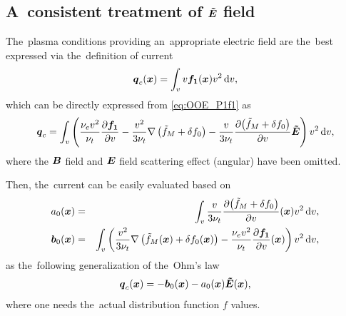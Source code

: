 \documentclass[preprint,12pt]{elsarticle}
\newcounter{bla}
\begin{document}
\subsection{A~consistent treatment of $\boldsymbol{\tilde{E}}$ field}
\label{sec:OOE_E_treatment}
The~plasma conditions providing an~appropriate electric field
are the~best expressed via the~definition of current
\begin{equation}
  \boldsymbol{q}_c(\boldsymbol{x}) = \int_{v}
  v\boldsymbol{f_1}(\boldsymbol{x}) v^2\, \text{d}v , 
  \nonumber 
\end{equation}
which can be directly expressed from \eqref{eq:OOE_P1f1} as
\begin{equation}
  \boldsymbol{q}_c =
  \int_{v} \left(\frac{\nu_{e}v^2}{\nu_{t}}\frac{\partial{\boldsymbol{f_1}}}{\partial{v}}
  - \frac{v^2}{3\nu_{t}}\nabla\left(\tilde{f}_M + \delta f_0\right) - 
  \frac{v}{3\nu_{t}}\frac{\partial{\left(\tilde{f}_M+ \delta f_0\right)}}{\partial{v}}\boldsymbol{\tilde{E}}
  \right) v^2\, \text{d}v ,
  \label{eq:OOE_P1current}
\end{equation}
where the $\boldsymbol{B}$ field and $\boldsymbol{E}$ field scattering effect (angular) have been 
omitted.  

Then, the~current can be easily evaluated based on
\begin{eqnarray}
  a_0(\boldsymbol{x}) &=& \int_{v}\frac{v}{3 \nu_{t}} \frac{\partial{\left(\tilde{f}_M+ \delta f_0\right)}}{\partial{v}}(\boldsymbol{x})
  v^2\, \text{d}v , \nonumber \\
  \boldsymbol{b}_{0}(\boldsymbol{x}) &=& \int_{v}\left(  
  \frac{v^2}{3 \nu_{t}}\nabla\left(\tilde{f}_M(\boldsymbol{x}) + \delta f_0(\boldsymbol{x})\right)
  - \frac{\nu_{e}v^2}{\nu_{t}}\frac{\partial{\boldsymbol{f_1}}}{\partial{v}}(\boldsymbol{x})
  \right)v^2\, \text{d}v , \nonumber 
\end{eqnarray}
as the~following generalization of the~Ohm's law
\begin{equation}
  \boldsymbol{q}_c(\boldsymbol{x}) 
  = -\boldsymbol{b}_{0}(\boldsymbol{x}) 
  - a_{0}(\boldsymbol{x})\boldsymbol{\tilde{E}}(\boldsymbol{x}) ,
  \nonumber \label{eq:OOE_HOFcurrent}
\end{equation}
where one needs the~actual distribution function $f$ values.

\end{document}

